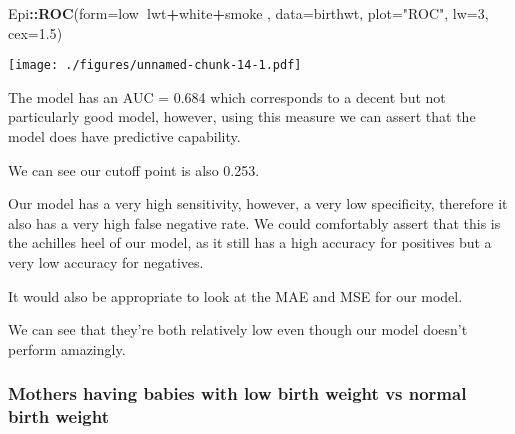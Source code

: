 \documentclass[]{article}
\newenvironment{Shaded}{\begin{snugshade}}{\end{snugshade}}
\newcommand{\CommentTok}[1]{\textcolor[rgb]{0.56,0.35,0.01}{\textit{#1}}}
\newcommand{\DataTypeTok}[1]{\textcolor[rgb]{0.13,0.29,0.53}{#1}}
\newcommand{\DecValTok}[1]{\textcolor[rgb]{0.00,0.00,0.81}{#1}}
\newcommand{\FloatTok}[1]{\textcolor[rgb]{0.00,0.00,0.81}{#1}}
\newcommand{\KeywordTok}[1]{\textcolor[rgb]{0.13,0.29,0.53}{\textbf{#1}}}
\newcommand{\NormalTok}[1]{#1}
\newcommand{\OperatorTok}[1]{\textcolor[rgb]{0.81,0.36,0.00}{\textbf{#1}}}
\newcommand{\StringTok}[1]{\textcolor[rgb]{0.31,0.60,0.02}{#1}}
\begin{document}
\begin{Shaded}
\begin{Highlighting}[]
\NormalTok{Epi}\OperatorTok{::}\KeywordTok{ROC}\NormalTok{(}\DataTypeTok{form=}\NormalTok{low}\OperatorTok{~}\NormalTok{lwt}\OperatorTok{+}\NormalTok{white}\OperatorTok{+}\NormalTok{smoke , }\DataTypeTok{data=}\NormalTok{birthwt, }\DataTypeTok{plot=}\StringTok{"ROC"}\NormalTok{, }\DataTypeTok{lw=}\DecValTok{3}\NormalTok{, }\DataTypeTok{cex=}\FloatTok{1.5}\NormalTok{)}
\end{Highlighting}
\end{Shaded}

\texttt{[image: ./figures/unnamed-chunk-14-1.pdf]}

The model has an AUC = 0.684 which corresponds to a decent but not
particularly good model, however, using this measure we can assert that
the model does have predictive capability.

We can see our cutoff point is also 0.253.

Our model has a very high sensitivity, however, a very low specificity,
therefore it also has a very high false negative rate. We could
comfortably assert that this is the achilles heel of our model, as it
still has a high accuracy for positives but a very low accuracy for
negatives.

It would also be appropriate to look at the MAE and MSE for our model.

\begin{Shaded}
\end{Shaded}

We can see that they're both relatively low even though our model
doesn't perform amazingly.

\hypertarget{mothers-having-babies-with-low-birth-weight-vs-normal-birth-weight}{%
\subsubsection{Mothers having babies with low birth weight vs normal
birth
weight}\label{mothers-having-babies-with-low-birth-weight-vs-normal-birth-weight}}
\end{document}
